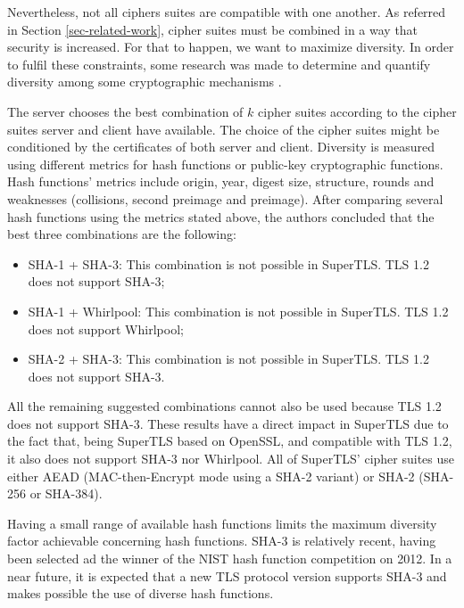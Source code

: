 \documentclass{sig-alternate-05-2015}
\begin{document}
Nevertheless, not all ciphers suites are compatible with one another. As referred in Section \ref{sec-related-work}, cipher suites must be combined in a way that security is increased. For that to happen, we want to maximize diversity.
In order to fulfil these constraints, some research was made to determine and quantify diversity among some cryptographic mechanisms \cite{CarvalhoThesis14}.

The server chooses the best combination of $k$ cipher suites according to the cipher suites server and client have available. The choice of the cipher suites might be conditioned by the certificates of both server and client.
Diversity is measured using different metrics for hash functions or public-key cryptographic functions. Hash functions' metrics include origin, year, digest size, structure, rounds and weaknesses (collisions, second preimage and preimage).
After comparing several hash functions using the metrics stated above, the authors concluded that the best three combinations are the following:
\begin{itemize}
\item {SHA-1 + SHA-3: This combination is not possible in SuperTLS. TLS 1.2 does not support SHA-3;}
\item {SHA-1 + Whirlpool: This combination is not possible in SuperTLS. TLS 1.2 does not support Whirlpool;} 
\item {SHA-2 + SHA-3: This combination is not possible in SuperTLS. TLS 1.2 does not support SHA-3.}
\end{itemize}

All the remaining suggested combinations cannot also be used because TLS 1.2 does not support SHA-3.
These results have a direct impact in SuperTLS due to the fact that, being SuperTLS based on OpenSSL, and compatible with TLS 1.2, it also does not support SHA-3 nor Whirlpool. All of SuperTLS' cipher suites use either AEAD (MAC-then-Encrypt mode using a SHA-2 variant) or SHA-2 (SHA-256 or SHA-384).

Having a small range of available hash functions limits the maximum diversity factor achievable concerning hash functions.
SHA-3 is relatively recent, having been selected ad the winner of the NIST hash function competition on 2012. In a near future, it is expected that a new TLS protocol version supports SHA-3 and makes possible the use of diverse hash functions.
\end{document}
